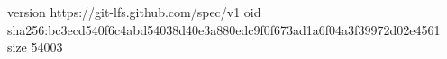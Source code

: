 version https://git-lfs.github.com/spec/v1
oid sha256:bc3ecd540f6c4abd54038d40e3a880edc9f0f673ad1a6f04a3f39972d02e4561
size 54003
